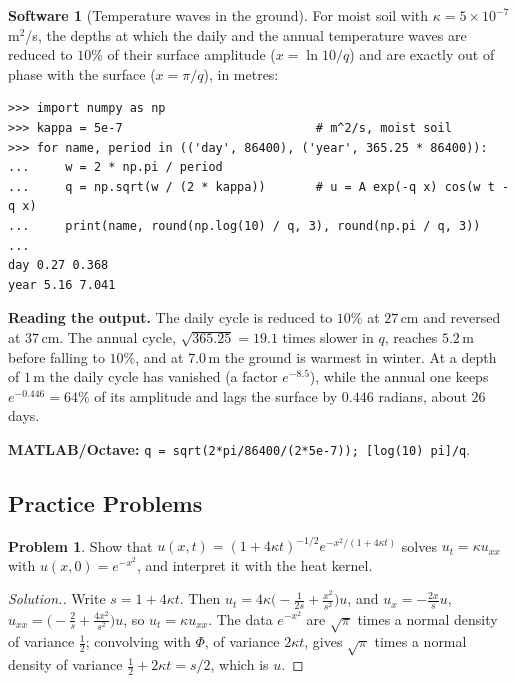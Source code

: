 \documentclass[11pt,a4paper]{article}
\numberwithin{equation}{section}
\theoremstyle{definition}
\newtheorem{software}[thm]{Software}
\newtheorem{problemx}{Problem}[subsection]
\newenvironment{problem}{\begin{problemx}}{\end{problemx}}
\newenvironment{solution}
  {\renewcommand{\qedsymbol}{}\begin{proof}[\textit{Solution}.]}
  {\end{proof}}
\begin{document}
\begin{software}[Temperature waves in the ground]
\label{sw:cellar}
For moist soil with $\kappa = 5 \times 10^{-7}$\,m$^2$/s, the depths at which the daily and the annual temperature waves are reduced to $10\%$ of their surface amplitude ($x = \ln 10/q$) and are exactly out of phase with the surface ($x = \pi/q$), in metres:
{\small\begin{verbatim}
>>> import numpy as np
>>> kappa = 5e-7                           # m^2/s, moist soil
>>> for name, period in (('day', 86400), ('year', 365.25 * 86400)):
...     w = 2 * np.pi / period
...     q = np.sqrt(w / (2 * kappa))       # u = A exp(-q x) cos(w t - q x)
...     print(name, round(np.log(10) / q, 3), round(np.pi / q, 3))
...
day 0.27 0.368
year 5.16 7.041
\end{verbatim}}
\textbf{Reading the output.} The daily cycle is reduced to $10\%$ at $27$\,cm and reversed at $37$\,cm. The annual cycle, $\sqrt{365.25} = 19.1$ times slower in $q$, reaches $5.2$\,m before falling to $10\%$, and at $7.0$\,m the ground is warmest in winter. At a depth of $1$\,m the daily cycle has vanished (a factor $e^{-8.5}$), while the annual one keeps
$e^{-0.446} = 64\%$ of its amplitude and lags the surface by $0.446$ radians, about $26$ days.

\textbf{MATLAB/Octave:} \texttt{q = sqrt(2*pi/86400/(2*5e-7)); [log(10) pi]/q}.
\end{software}

\subsection{Practice Problems}

\begin{problem}
Show that $u(x, t) = (1 + 4\kappa t)^{-1/2}e^{-x^2/(1 + 4\kappa t)}$ solves $u_t = \kappa u_{xx}$ with $u(x, 0) = e^{-x^2}$, and interpret it with the heat kernel.
\end{problem}

\begin{solution}
Write $s = 1 + 4\kappa t$. Then $u_t = 4\kappa\bigl(-\frac1{2s} + \frac{x^2}{s^2}\bigr)u$, and $u_x = -\frac{2x}su$, $u_{xx} = \bigl(-\frac2s + \frac{4x^2}{s^2}\bigr)u$, so $u_t = \kappa u_{xx}$. The data $e^{-x^2}$ are $\sqrt\pi$ times a normal density of variance $\frac12$; convolving with $\Phi$, of variance $2\kappa t$, gives
$\sqrt\pi$ times a normal density of variance $\frac12 + 2\kappa t = s/2$, which is $u$.
\end{solution}
\end{document}

